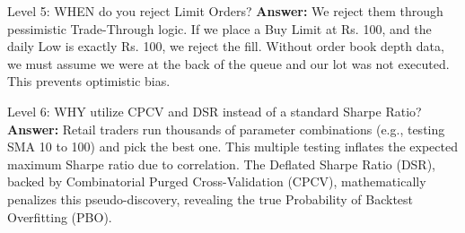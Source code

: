 \documentclass[12pt,a4paper,oneside]{report}
\begin{document}
\begin{defensebox}{Level 5: WHEN do you reject Limit Orders?}
\textbf{Answer:} We reject them through pessimistic Trade-Through logic. If we place a Buy Limit at Rs. 100, and the daily Low is exactly Rs. 100, we reject the fill. Without order book depth data, we must assume we were at the back of the queue and our lot was not executed. This prevents optimistic bias.
\end{defensebox}

\begin{defensebox}{Level 6: WHY utilize CPCV and DSR instead of a standard Sharpe Ratio?}
\textbf{Answer:} Retail traders run thousands of parameter combinations (e.g., testing SMA 10 to 100) and pick the best one. This multiple testing inflates the expected maximum Sharpe ratio due to correlation. The Deflated Sharpe Ratio (DSR), backed by Combinatorial Purged Cross-Validation (CPCV), mathematically penalizes this pseudo-discovery, revealing the true Probability of Backtest Overfitting (PBO).
\end{defensebox}
\end{document}
